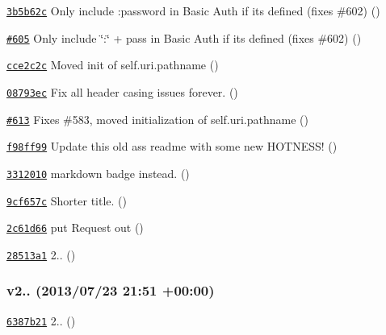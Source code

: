 \begin{DoxyItemize}
\item \href{https://github.com/mikeal/request/commit/3b5b62cdd4f3b92e63a65d3a7265f5a85b11c4c9}{\tt 3b5b62c} Only include \+:password in Basic Auth if it\textquotesingle{}s defined (fixes \#602) ()
\item \href{https://github.com/mikeal/request/pull/605}{\tt \#605} Only include \char`\"{}\+:\char`\"{} + pass in Basic Auth if it\textquotesingle{}s defined (fixes \#602) ()
\item \href{https://github.com/mikeal/request/commit/cce2c2c8ea5b0136932b2432e4e25c0124d58d5a}{\tt cce2c2c} Moved init of self.\+uri.\+pathname ()
\item \href{https://github.com/mikeal/request/commit/08793ec2f266ef88fbe6c947e6b334e04d4b9dc9}{\tt 08793ec} Fix all header casing issues forever. ()
\item \href{https://github.com/mikeal/request/pull/613}{\tt \#613} Fixes \#583, moved initialization of self.\+uri.\+pathname ()
\item \href{https://github.com/mikeal/request/commit/f98ff990d294165498c9fbf79b2de12722e5c842}{\tt f98ff99} Update this old ass readme with some new H\+O\+T\+N\+E\+S\+S! ()
\item \href{https://github.com/mikeal/request/commit/3312010f72d035f22b87a6d8d463f0d91b88fea1}{\tt 3312010} markdown badge instead. ()
\item \href{https://github.com/mikeal/request/commit/9cf657c1f08bf460911b8bb0a8c5c0d3ae6135c7}{\tt 9cf657c} Shorter title. ()
\item \href{https://github.com/mikeal/request/commit/2c61d66f1dc323bb612729c7320797b79b22034c}{\tt 2c61d66} put Request out ()
\item \href{https://github.com/mikeal/request/commit/28513a1b371452699438c0eb73471f8969146264}{\tt 28513a1} 2.. ()
\end{DoxyItemize}

\subsubsection*{v2.. (2013/07/23 21\+:51 +00\+:00)}


\begin{DoxyItemize}
\item \href{https://github.com/mikeal/request/commit/6387b21a9fb2e16ee4dd2ab73b757eca298587b5}{\tt 6387b21} 2.. ()
\end{DoxyItemize}

